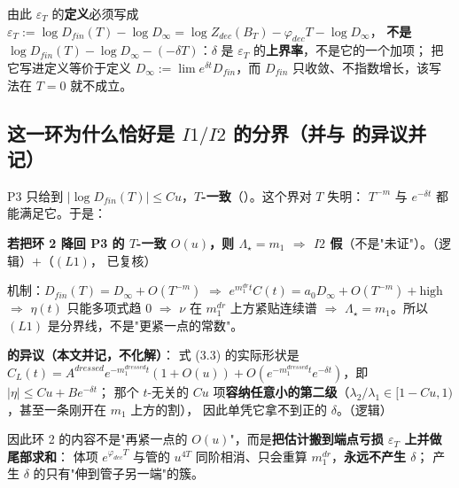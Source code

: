 由此 $\varepsilon_T$ 的\textbf{定义}必须写成 $\varepsilon_T:=\log D_{fin}(T)-\log D_\infty=\log Z_{dec}(B_T)-\varphi_{dec}T-\log D_\infty$，
\textbf{不是} $\log D_{fin}(T)-\log D_\infty-(-\delta T)$：$\delta$ 是 $\varepsilon_T$ 的\textbf{上界率}，不是它的一个加项；
把它写进定义等价于定义 $D_\infty:=\lim e^{\delta t}D_{fin}$，而 $D_{fin}$ 只收敛、不指数增长，该写法在 $T=0$ 就不成立。\LT
{}

\subsection{这一环为什么恰好是 $I1/I2$ 的分界（并与  的异议并记）}

P3 只给到 $|\log D_{fin}(T)|\le Cu$，\textbf{$T$-一致}（）。这个界对 $T$ 失明：
$T^{-m}$ 与 $e^{-\delta t}$ 都能满足它。于是：

\begin{notbox}
\textbf{若把环 2 降回 P3 的 $T$-一致 $O(u)$，则 $\Lambda_\star=m_1$ $\Rightarrow$ $I2$ 假}（不是"未证"）。\LT{}（逻辑）$+$\LT{}（$(L1)$， 已复核）
\par\smallskip
机制：$D_{fin}(T)=D_\infty+O(T^{-m})$ $\Rightarrow$ $e^{m_1^{dr}t}C(t)=a_0D_\infty+O(T^{-m})+\text{high}$ $\Rightarrow$ $\eta(t)$ 只能多项式趋 0
$\Rightarrow$ $\nu$ 在 $m_1^{dr}$ 上方紧贴连续谱 $\Rightarrow$ $\Lambda_\star=m_1$。所以 $(L1)$ 是分界线，不是"更紧一点的常数"。
\end{notbox}

\textbf{ 的异议（本文并记，不化解）}： 式 (3.3) 的实际形状是
$C_L(t)=A^{dressed}e^{-m_1^{dressed}t}(1+O(u))+O(e^{-m_1^{dressed}t}e^{-\delta t})$，即 $|\eta|\le Cu+Be^{-\delta t}$；
那个 $t$-无关的 $Cu$ 项\textbf{容纳任意小的第二级}（$\lambda_2/\lambda_1\in[1-Cu,1)$，甚至一条刚开在 $m_1$ 上方的割），
因此单凭它拿不到正的 $\delta$。\LT{}（逻辑）

因此环 2 的内容不是"再紧一点的 $O(u)$"，而是\textbf{把估计搬到端点亏损 $\varepsilon_T$ 上并做尾部求和}：
体项 $e^{\varphi_{dec}T}$ 与管的 $u^{4T}$ 同阶相消、只会重算 $m_1^{dr}$，\textbf{永远不产生 $\delta$}；
产生 $\delta$ 的只有"伸到管子另一端"的簇。\LT
{}

